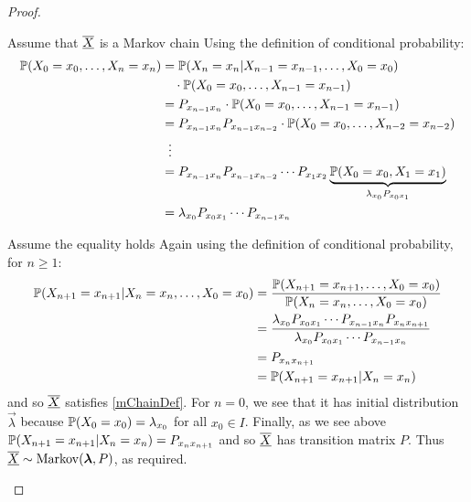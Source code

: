 \documentclass[../main.tex]{subfiles}
\begin{document}
\begin{proof}
  \begin{proofdirection}{Assume that $\mchain{X}$ is a Markov chain}
    Using the definition of conditional probability:
    \begin{align*}
      \P(X_0 = x_0, \ldots, X_n = x_n) &= \P(X_n = x_n \vert X_{n - 1} = x_{n - 1}, \ldots, X_0 = x_0) \\
                                       &\quad\cdot \P(X_0 = x_0, \ldots, X_{n - 1} = x_{n - 1}) \\
                                       &= P_{x_{n - 1} x_n} \cdot \P(X_0 = x_0, \ldots, X_{n - 1} = x_{n - 1}) \\
                                       &= P_{x_{n - 1} x_n} P_{x_{n - 1} x_{n - 2}} \cdot \P(X_0 = x_0, \ldots, X_{n - 2} = x_{n - 2}) \\
                                       &\; \; \vdots \\
                                       &= P_{x_{n - 1} x_n} P_{x_{n - 1} x_{n - 2}} \cdots P_{x_1 x_2} \underbrace{\P(X_0 = x_0, X_1 = x_1)}_{\lambda_{x_0}P_{x_0 x_1}} \\
                                       &= \lambda_{x_0} P_{x_0 x_1} \cdots P_{x_{n - 1} x_n}
    \end{align*}
  \end{proofdirection}
  \begin{proofdirection}{Assume the equality holds}
    Again using the definition of conditional probability, for $n \geq 1$:
    \begin{align*}
      \P(X_{n + 1} = x_{n + 1} \vert X_n = x_n, \ldots, X_0 = x_0) &= \frac{\P(X_{n + 1} = x_{n + 1}, \ldots, X_0 = x_0)}{\P(X_n = x_n, \ldots, X_0 = x_0)} \\
                                                                   &= \frac{\lambda_{x_0} P_{x_0 x_1} \cdots P_{x_{n - 1} x_n} P_{x_n x_{n + 1}}}{\lambda_{x_0} P_{x_0 x_1} \cdots P_{x_{n - 1} x_n}} \\
                                                                   &= P_{x_n x_{n + 1}} \\
                                                                   &= \P(X_{n + 1} = x_{n + 1} \vert X_n = x_n)
    \end{align*}
    and so $\mchain{X}$ satisfies \cref{mChainDef}.
    For $n = 0$, we see that it has initial distribution $\vec{\lambda}$ because $\P(X_0 = x_0) = \lambda_{x_0}$ for all $x_0 \in I$.
    Finally, as we see above $\P(X_{n + 1} = x_{n + 1} \vert X_n = x_n) = P_{x_n x_{n + 1}}$ and so $\mchain{X}$ has transition matrix $P$.
    Thus $\mchain{X} \sim \markov(\vec{\lambda}, P)$, as required.
  \end{proofdirection}
\end{proof}
\end{document}
